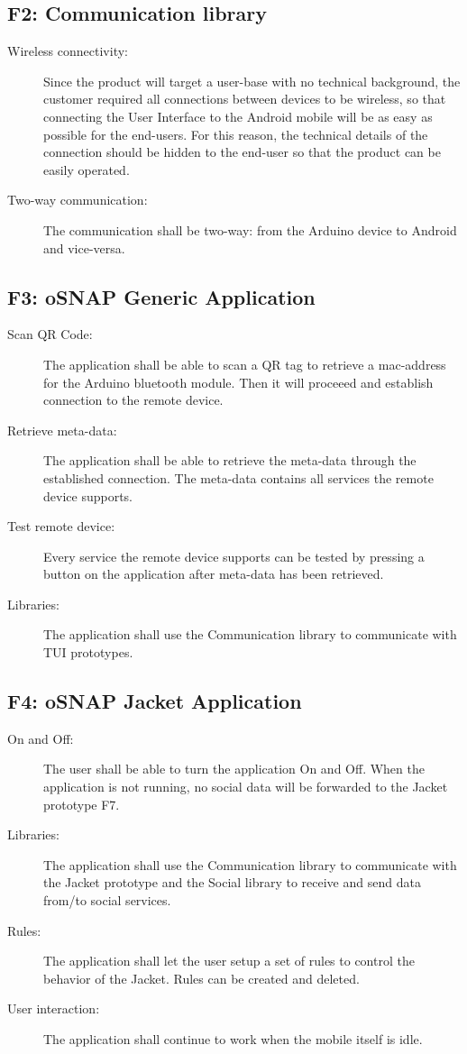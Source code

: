 \subsection{F2: Communication library}
\begin{description}
	\item[Wireless connectivity:] Since the product will target a user-base
	with no technical background, the customer required all connections
	between devices to be wireless, so that connecting the User Interface
	to the Android mobile will be as easy as possible for the end-users.
	For this reason, the technical details of the connection should be
	hidden to the end-user so that the product can be easily operated.
	\item[Two-way communication:] The communication shall be two-way:
	from the Arduino device to Android and vice-versa.
\end{description}

\newpage

\subsection{F3: oSNAP Generic Application}
\begin{description}
	\item[Scan QR Code:] The application shall be able to scan a QR tag to
	retrieve a mac-address for the Arduino bluetooth module. Then it will proceeed and
	establish connection to the remote device.
	\item[Retrieve meta-data:] The application shall be able to retrieve the
	meta-data through the established connection. The meta-data contains all
	services the remote device supports.
	\item[Test remote device:] Every service the remote device supports can be
	tested by pressing a button on the application after meta-data has been
	retrieved.
	\item[Libraries:] The application shall use the Communication library
	to communicate with TUI prototypes.
\end{description}

\subsection{F4: oSNAP Jacket Application}
\begin{description}
	\item[On and Off:] The user shall be able to turn the application On
	and Off. When the application is not running, no social data will be
	forwarded to the Jacket prototype F7.
	\item[Libraries:] The application shall use the Communication library to
	communicate with the Jacket prototype and the Social library to
	receive and send data from/to social services.
	\item[Rules:] The application shall let the user setup a set of rules
	to control the behavior of the Jacket. Rules can be created and deleted.
	\item[User interaction:] The application shall continue to work
	when the mobile itself is idle.
\end{description}

